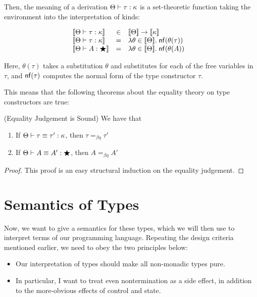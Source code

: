 Then, the meaning of a derivation ${\Theta} \vdash {\tau} : {\kappa}$ is a set-theoretic
function taking the environment into the interpretation of kinds: 

\begin{displaymath}
  \begin{array}{lcl}
    \interp{\judgeWK{\tau}{\kappa}} & \in & \interp{\Theta} \to \interp{\kappa} \\
    \interp{\judgeWK{\tau}{\kappa}} & = & \semfun{\theta \in \interp{\Theta}}{\normalize{\theta(\tau)}} \\
    \interp{\judgeWK{A}{\bigstar}} & = & \semfun{\theta \in \interp{\Theta}}{\normalize{\theta(A)}} \\
  \end{array}
\end{displaymath}

Here, $\theta(\tau)$ takes a substitution $\theta$ and substitutes for
each of the free variables in $\tau$, and $\mathsf{nf}({\tau})$ computes
the normal form of the type constructor $\tau$. 

This means that the following theorems about the equality theory on
type constructors are true: 

\begin{prop}{(Equality Judgement is Sound)}
We have that 
\begin{enumerate}
\item If ${\Theta} \vdash {\tau} \equiv {\tau'} : {\kappa}$, then $\tau =_{\beta\eta} \tau'$ 
\item If ${\Theta} \vdash {A} \equiv {A'} : {\bigstar}$, then $A =_{\beta\eta} A'$ 
\end{enumerate}
\end{prop}

\begin{proof}
This proof is an easy structural induction on the equality judgement. 
\end{proof}

\section{Semantics of Types}

Now, we want to give a semantics for these types, which we will then
use to interpret terms of our programming language. Repeating the
design criteria mentioned earlier, we need to obey the two principles
below:

\begin{itemize}
\item Our interpretation of types should make all non-monadic types 
  pure. 
\item In particular, I want to treat even nontermination as a side
  effect, in addition to the more-obvious effects of control and state. 
\end{itemize}

